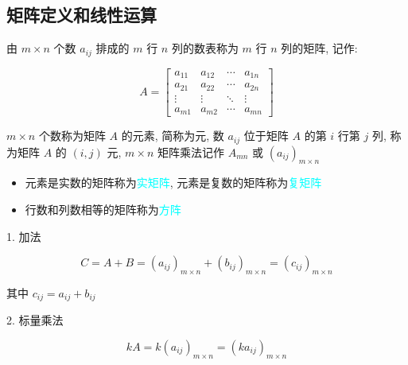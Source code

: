 \subsection{矩阵定义和线性运算}
\begin{definition}[矩阵定义]
	由 $m\times n$ 个数 $a_{ij}$ 排成的 $m$ 行 $n$ 列的数表称为 $m$ 行 $n$ 列的矩阵, 记作:
	
	$$A = \begin{bmatrix}
		a_{11} & a_{12} & \cdots & a_{1n}\\
		a_{21} & a_{22} & \cdots & a_{2n}\\
		\vdots & \vdots & \ddots & \vdots\\
		a_{m1} & a_{m2} & \cdots & a_{mn}
	\end{bmatrix}$$

	$m\times n$ 个数称为矩阵 $A$ 的元素, 简称为元, 数 $a_{ij}$ 位于矩阵 $A$ 的第 $i$ 行第 $j$ 列, 称为矩阵 $A$ 的 $(i,j)$ 元, 
	$m\times n$ 矩阵乘法记作 $A_{mn}$ 或 $(a_{ij})_{m\times n}$
	\begin{itemize}
		\item  元素是实数的矩阵称为\textcolor{cyan}{实矩阵}, 元素是复数的矩阵称为\textcolor{cyan}{复矩阵}
		\item  行数和列数相等的矩阵称为\textcolor{cyan}{方阵}
	\end{itemize}
\end{definition}

\begin{definition}[矩阵的线性运算]
	\textcolor{purpleb}{1. 加法}

	$$C=A + B=(a_{ij})_{m\times n} + (b_{ij})_{m\times n}=(c_{ij})_{m\times n}$$
	
	其中 $c_{ij}=a_{ij} + b_{ij}$

	\textcolor{purpleb}{2. 标量乘法}

	$$kA=k(a_{ij})_{m\times n}=(ka_{ij})_{m\times n}$$
\end{definition}

